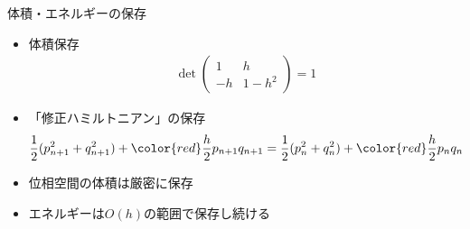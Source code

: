 \begin{frame}[t,fragile]{体積・エネルギーの保存}
  \begin{itemize}
  \item 体積保存
    \begin{align*}
      \det \begin{pmatrix} 1 & h \\ -h & 1-h^2 \end{pmatrix} = 1
    \end{align*}
  \item 「修正ハミルトニアン」の保存
    \begin{align*}
      \frac{1}{2}(p_{n+1}^2+q_{n+1}^2) + {\color{red}\frac{h}{2} p_{n+1} q_{n+1}} = \frac{1}{2}(p_{n}^2+q_{n}^2) + {\color{red}\frac{h}{2} p_{n} q_{n}}
    \end{align*}
  \item 位相空間の体積は厳密に保存
  \item エネルギーは$O(h)$の範囲で保存し続ける
  \end{itemize}
\end{frame}

